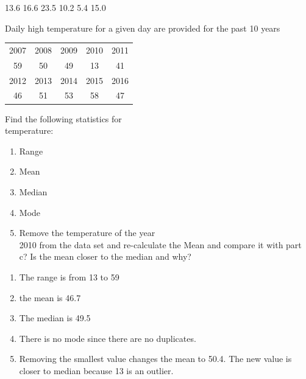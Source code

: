 \documentclass[11pt, chapterprefix=true]{scrbook}\usepackage[]{graphicx}\usepackage[]{color}
\begin{document}
\begin{exercises}
\begin{exercise}
13.6    16.6    23.5    10.2     5.4     15.0

 	\end{exercise}

  \begin{exercise} %

  Daily high temperature for a given day are provided for the past 10 years

\begin{tabular}{@{} ccccc @{}} \hline
2007&2008&2009&2010&2011 \\
59&50&49&13&41 \\ \hline
2012&2013&2014&2015&2016 \\
46&51&53&58&47 \\ \hline
\end{tabular}

Find the following statistics for \\ temperature:

\begin{enumerate}
\item Range
\item Mean
\item Median
\item Mode
\item Remove the temperature of the year \\ 2010 from the data set and re-calculate the Mean and compare it with part c? Is the mean closer to the median and why?
\end{enumerate}


   \end{exercise}
   \begin{solution} %



\begin{enumerate}
\item The range is from 13 to 59
\item the mean is 46.7
\item The median is 49.5
\item There is no mode since there are no duplicates.
\item Removing the smallest value changes the mean to 50.4.  The new value is closer to median because 13 is an outlier.
\end{enumerate}
  \end{solution}


\end{exercises}
\end{document}
